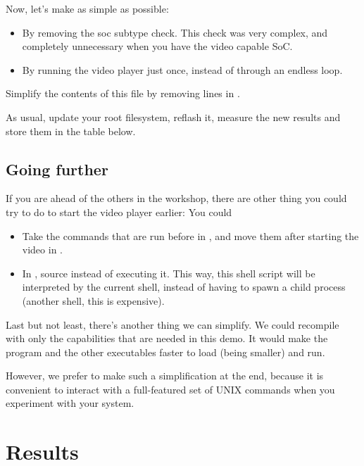 Now, let's make  as simple as possible:

\begin{itemize}
\item By removing the soc subtype check. 
      This check was very complex, and completely unnecessary
      when you have the video capable SoC.
\item By running the video player just once, instead of through 
      an endless  loop.
\end{itemize}

Simplify the contents of this file by removing lines
in .

As usual, update your root filesystem, reflash it, measure the
new results and store them in the table below.

\subsection{Going further}

If you are ahead of the others in the workshop, there are 
other thing you could try to do to start the video player earlier: You could

\begin{itemize}
\item Take the commands that are run before  in
      , and move them after starting the video in
      .
\item In , source  instead of
      executing it. This way, this shell script will be interpreted
      by the current shell, instead of having to spawn a child process
      (another shell, this is expensive).
\end{itemize}

Last but not least, there's another thing we can simplify. We could
recompile  with only the capabilities that are needed
in this demo. It would make the  program and the other 
executables faster to load (being smaller) and run.

However, we prefer to make such a simplification at the end, because
it is convenient to interact with a full-featured set of UNIX commands
when you experiment with your system.
 
\section{Results}

